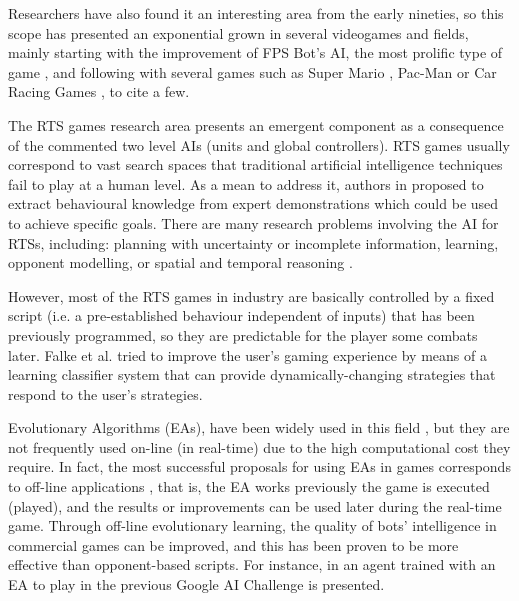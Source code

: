 \documentclass[runningheads]{llncs}
\begin{document}
Researchers have also found it an interesting area from the early nineties, so this scope has presented an exponential grown in several videogames and fields, mainly starting with the improvement of FPS Bot's AI, the most prolific type of game \cite{laird2001using,cooperativebots_CIG2010}, and following with several games such as Super Mario \cite{Togelius_SuperMario}, Pac-Man \cite{Pac-MAnt_CIG2010} or Car Racing Games \cite{CarRacing_Pelta09}, to cite a few.

The RTS games research area presents an emergent component \cite{emergence_in_games2008} as a consequence of the commented two level AIs (units and global controllers). RTS games usually correspond to vast search spaces that traditional artificial intelligence techniques fail to play at a human level. As a mean to address it, authors in \cite{ontanon2007} proposed to extract behavioural knowledge from expert demonstrations which could be used to achieve specific goals. 
There are many research problems involving the AI for RTSs, including: planning with uncertainty or incomplete information, learning, opponent modelling, or spatial and temporal reasoning \cite{AIRTS2004}. 

However, most of the RTS games in industry are basically controlled by a fixed script (i.e. a pre-established behaviour independent of inputs) that has been previously programmed, so they are predictable for the player some combats later. Falke et al. \cite{falke2003} tried to improve the user's gaming experience by means of a learning classifier system that can provide dynamically-changing strategies that respond to the user's strategies.  




Evolutionary Algorithms (EAs), have been widely used in this field \cite{Ponsen_EvLearn_RTS,Su-EAs_StrategySel09}, 
but they are not frequently used on-line (in real-time) due to the high computational cost they require. In fact, the most successful proposals for using EAs in games corresponds to off-line applications \cite{offline-evolutionary-learning}, that is, the EA works previously the game is executed (played), and the results or improvements can be used later during  the real-time game. Through off-line evolutionary learning, the quality of bots' intelligence in commercial games can be improved, and this has been proven to be more effective than opponent-based scripts.
For instance, in \cite{GENEBOTEVOSTAR12} an agent trained with an EA to play in the previous Google AI Challenge is presented. %
\end{document}
